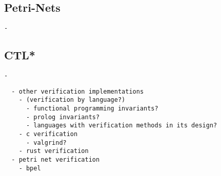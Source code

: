 \subsection{Petri-Nets}
\label{rel_petri}
\begin{verbatim}
- 
\end{verbatim}

\subsection{CTL*}
\label{rel_ctl}
\begin{verbatim}
- 
\end{verbatim}

\begin{verbatim}
  - other verification implementations
    - (verification by language?)
      - functional programming invariants?
      - prolog invariants?
      - languages with verification methods in its design?
    - c verification
      - valgrind?
    - rust verification
  - petri net verification
    - bpel
\end{verbatim}